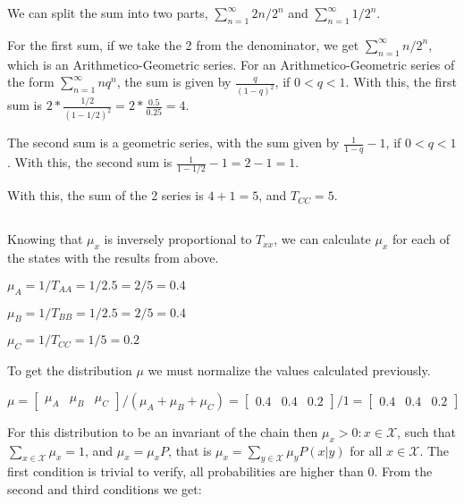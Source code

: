 \documentclass{article}
\begin{document}
\bigskip

We can split the sum into two parts, $\sum_{n=1}^{\infty} 2n / 2^n$ and $\sum_{n=1}^{\infty} 1 / 2^n$.

For the first sum, if we take the 2 from the denominator, we get $\sum_{n=1}^{\infty} n / 2^{n}$, which is an Arithmetico-Geometric series.
For an Arithmetico-Geometric series of the form $\sum_{n=1}^{\infty} nq^{n}$, the sum is given by $\frac{q}{(1 - q)^2}$, if $0 < q < 1$.
With this, the first sum is $ 2 * \frac{1/2}{(1 - 1/2)^2} = 2 * \frac{0.5}{0.25} = 4$.

The second sum is a geometric series, with the sum given by $\frac{1}{1 - q} - 1$, if $0 < q < 1$.
With this, the second sum is $\frac{1}{1 - 1/2} - 1 = 2 - 1 = 1$.

\bigskip

With this, the sum of the 2 series is $4 + 1 = 5$, and $T_{CC} = 5$.

\subsection{}

Knowing that $\mu_{x}$ is inversely proportional to $T_{xx}$, we can calculate $\mu_{x}$ for each of the states with the results from above.

\bigskip

$\mu_{A} = 1 / T_{AA} = 1 / 2.5 = 2 / 5 = 0.4$

$\mu_{B} = 1 / T_{BB} = 1 / 2.5 = 2 / 5 = 0.4$

$\mu_{C} = 1 / T_{CC} = 1 / 5 = 0.2$

\bigskip

To get the distribution $\mu$ we must normalize the values calculated previously.

\bigskip

$\mu = \begin{bmatrix} \mu_{A} & \mu_{B} & \mu_{C} \end{bmatrix} / (\mu_{A} + \mu_{B} + \mu_{C}) = \begin{bmatrix} 0.4 & 0.4 & 0.2 \end{bmatrix} / 1 = \begin{bmatrix} 0.4 & 0.4 & 0.2 \end{bmatrix}$

\bigskip

For this distribution to be an invariant of the chain then $\mu_{x} > 0 : x \in \mathcal{X}$, such that 
$\sum_{x \in \mathcal{X}} \mu_{x} = 1$, and $\mu_{x} = \mu_{x}P$, that is $\mu_{x} = \sum_{y \in \mathcal{X}} \mu_{y}P(x | y)$ 
for all $x \in \mathcal{X}$.
The first condition is trivial to verify, all probabilities are higher than 0.
From the second and third conditions we get:
\end{document}
